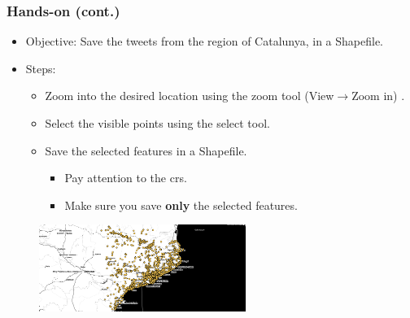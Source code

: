 \documentclass[hyperref={pdfpagelabels=true}]{beamer}
\begin{document}
\begin{frame}
\frametitle{Hands-on (cont.)}
\begin{itemize}
  \item<1->Objective: Save the tweets from the region of Catalunya, in a Shapefile.
  \item<1->Steps:  
  \begin{itemize}
    \item<2->Zoom into the desired location using the zoom tool (View$\rightarrow$Zoom in) .  
    \item<2->Select the visible points using the select tool.
    \item<2->Save the selected features in a Shapefile.
    \begin{itemize}
      \item<2->Pay attention to the crs.
      \item<2->Make sure you save \textbf{only} the selected features.      
    \end{itemize}    
  \end{itemize}    
\end{itemize}  

  \begin{figure}  
      \includegraphics[width=0.6\textwidth]{sel_tweets.png}\\
    \end{figure}         
\end{frame}
\end{document}
